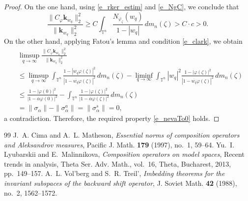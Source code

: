 \documentclass[10pt,a4paper]{amsart}
\newcommand{\al}{\alpha}
\newcommand{\clk}{\sigma}
\newcommand{\cph}{C_\varphi}
\newcommand{\kknl}{\mathbf{k}}
\newcommand{\meal}{m_n}
\newcommand{\neva}{N}
\newcommand{\ph}{\varphi}
\newcommand{\tn}{\mathbb{T}^n}
\newcommand{\za}{\zeta}
\begin{document}
\begin{proof}
On the one hand, using \eqref{e_rker_estim} and \eqref{e_NgC}, we conclude that
\[
\frac{\|\cph \kknl_{w_q}\|_2^2}{\|\kknl_{w_q}\|_2^2}
\ge C \int_{\tn} \frac{\neva_{\ph_\za}(w_q)}{1-|w_q|}\, d\meal(\za) > C\cdot c > 0.
\]
On the other hand, applying Fatou's lemma and condition \eqref{e_clark}, we obtain
\[
\begin{split}
   &\limsup_{q\to \infty} \frac{\|\cph \kknl_{w_q}\|_2^2}{\|\kknl_{w_q}\|_2^2}
   \\
&\le \limsup_{q\to \infty} \int_{\tn} \frac{1-|w_q\ph(\za)|^2}{|1- \overline{w_q}\ph(\za)|^2} \, d\meal(\za)
- \liminf_{q\to \infty} \int_{\tn} |w_q|^2 \frac{1-|\ph(\za)|^2}{|1- \overline{w_q}\ph(\za) |^2}\, d\meal(\za) \\
&\le \frac{1-|\ph(0)|^2}{|1- \overline{\al}\ph(0)|^2}
- \int_{\tn} \frac{1-|\ph(\za)|^2}{|1- \overline{\al}\ph(\za) |^2}\, d\meal(\za) \\
     &= \|\clk_\al\| - \|\clk_\al^a\| = \|\clk_\al^s\| =0,
\end{split}
\]
a contradiction. Therefore, the required property \eqref{e_nevaTo0} holds.
\end{proof}

\begin{thebibliography}{99}
 J.~A. Cima and A.~L. Matheson, \emph{Essential norms of composition operators and {A}leksandrov measures}, Pacific J. Math. \textbf{179} (1997), no.~1, 59--64. 
 Yu.~I. Lyubarskii and E.~Malinnikova, \emph{Composition operators on model spaces}, Recent trends in analysis, Theta Ser. Adv. Math., vol.~16, Theta, Bucharest, 2013, pp.~149--157. 
 A.~L. Vol'berg and S.~R. Treil', \emph{Imbedding theorems for the invariant subspaces of the backward shift operator}, J. Soviet Math. \textbf{42} (1988), no.~2, 1562--1572. 
\end{thebibliography}
\end{document}
